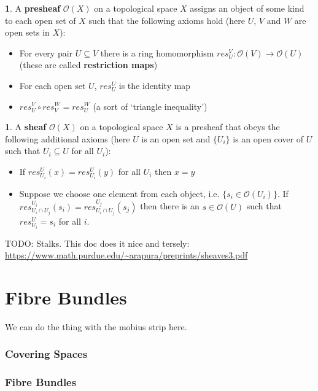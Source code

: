 \documentclass[oneside,english]{amsbook}
\numberwithin{section}{chapter}
\theoremstyle{plain}
\theoremstyle{definition}
\newtheorem{defn}[thm]{\protect\definitionname}
\providecommand{\definitionname}{Definition}
\begin{document}
		\begin{defn} 
			A \textbf{presheaf} $\mathscr{O}(X)$ on a topological space $X$ assigns an object of some kind to each open set of $X$ such that the following axioms hold (here $U$, $V$ and $W$ are open sets in $X$):
			\begin{itemize}
				\item For every pair $U\subseteq V$ there is a ring homomorphism $res_U^V: \mathscr{O}(V)\to \mathscr{O}(U)$ (these are called \textbf{restriction maps})
				\item For each open set $U$, $res_U^U$ is the identity map
				\item $res_U^V \circ res_V^W = res_U^W$ (a sort of `triangle inequality')
			\end{itemize}
		\end{defn}
		
		\begin{defn} 
			A \textbf{sheaf} $\mathscr{O}(X)$ on a topological space $X$ is a presheaf that obeys the following additional axioms (here $U$ is an open set and  $\{U_i\}$ is an open cover of $U$ such that $U_i\subseteq U$ for all $U_i$):
			\begin{itemize}
				\item If $res_{U_i}^U(x) = res_{U_i}^U(y)$ for all $U_i$ then $x=y$
				\item Suppose we choose one element from each object, i.e. $\{s_i \in \mathscr{O}(U_i)\}$. If $res_{U_i\cap U_j}^{U_i}(s_i) = res_{U_i\cap U_j}^{U_j}(s_j)$ then there is an $s\in \mathscr{O}(U)$ such that $res_{U_i}^{U} = s_i$ for all $i$.
			\end{itemize}
		\end{defn}

	TODO: Stalks. This doc does it nice and tersely: \url{https://www.math.purdue.edu/~arapura/preprints/sheaves3.pdf}
	


\chapter{Fibre Bundles}

We can do the thing with the mobius strip here.


\subsection{Covering Spaces}

\subsection{Fibre Bundles}
\end{document}
